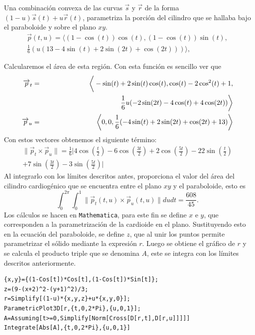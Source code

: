Una combinación convexa de las curvas $\overrightarrow{s}$ y $\overrightarrow{r}$ de la forma $(1-u)\overrightarrow{s}(t)+u\overrightarrow{r}(t)$,
parametriza la porción del cilindro que se hallaba bajo el paraboloide y sobre el plano $xy$.
{\small
\begin{multline*} \overrightarrow{p}(t,u)=\big\langle (1-\cos(t))\cos(t),(1-\cos(t))\sin(t), \\ \frac{1}{6}\left(u(13-4\sin(t)+2\sin(2t)+\cos(2t)) \right)\big\rangle,
\end{multline*}
}

Calcularemos el área de esta región. Con esta función es sencillo ver que
\begin{eqnarray*}
\overrightarrow{p}_{t}&=& \bigg \langle-\sin(t)+2\sin(t)\cos(t),\cos(t)-2\cos^{2}(t)+1,\\
&& \hspace{3.8cm} \frac{1}{6} u (-2 \sin (2 t)-4 \cos (t)+4\cos(2t)) \bigg \rangle \\
\overrightarrow{p}_{u}&=& \la 0,0,\frac{1}{6} (-4 \sin (t)+2 \sin (2 t)+\cos (2 t)+13) \ra
\end{eqnarray*}
Con estos vectores obtenemos el siguiente término:
\begin{multline*}
\|\overrightarrow{p}_{t}\times \overrightarrow{p}_{u}\|  =
\frac{1}{6}\bigg |4\cos\left(\frac{t}{2}\right)-6\cos\left(\frac{3t}{2}\right)+2\cos\left(\frac{5t}{2}\right)-22\sin\left(\frac{t}{2}\right)\\
+7\sin\left(\frac{3t}{2}\right)-3\sin\left(\frac{5t}{2}\right)\bigg |
\end{multline*}
Al integrarlo con los límites descritos antes, proporciona el valor del área del cilindro cardiogénico que se encuentra entre el plano $xy$ y el paraboloide, esto es
\[\int_{0}^{2\pi}\int_{0}^{1}\|\overrightarrow{p}_{t}(t,u)\times \overrightarrow{p}_{u}(t,u)\|dudt=\frac{608}{45}.\]
Los cálculos se hacen en \verb"Mathematica", para este fin se define $x$ e $y$, que corresponden a la parametrización de la cardioide en el plano. Sustituyendo esto en la ecuación del paraboloide, se define
$z$, que al unir los puntos permite parametrizar el sólido mediante la expresión $r$.
Luego se obtiene el gráfico de $r$ y se calcula el producto triple que se denomina $A$, este se integra con los límites descritos anteriormente.

\begin{tcolorbox}[title=\bf Instrucción en \verb"Mathematica"]\begin{Verbatim}[formatcom=\letraverbatim]
{x,y}={(1-Cos[t])*Cos[t],(1-Cos[t])*Sin[t]};
z=(9-(x+2)^2-(y+1)^2)/3;
r=Simplify[(1-u)*{x,y,z}+u*{x,y,0}];
ParametricPlot3D[r,{t,0,2*Pi},{u,0,1}];
A=Assuming[t>=0,Simplify[Norm[Cross[D[r,t],D[r,u]]]]]
Integrate[Abs[A],{t,0,2*Pi},{u,0,1}]
\end{Verbatim}
\end{tcolorbox}

